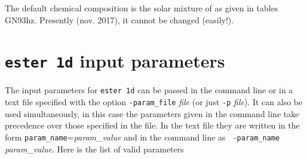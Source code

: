 The default chemical composition is the solar mixture of
\cite{GN93} as given in tables GN93hz. Presently (nov. 2017), it cannot be
changed (easily!).

\section{{\tt ester 1d} input parameters}

The input parameters for {\tt ester 1d} can be passed in the command line
or in a text file specified with the option {\tt -param\_file} {\it file}
(or just {\tt -p} {\it file}). It can also be used simultaneously, in
this case the parameters given in the command line take precedence over
those specified in the file. In the text file they are written in the
form {\tt param\_name}={\it param\_value} and in the command line as {\tt
-param\_name} {\it param\_value}.  Here is the list of valid parameters

